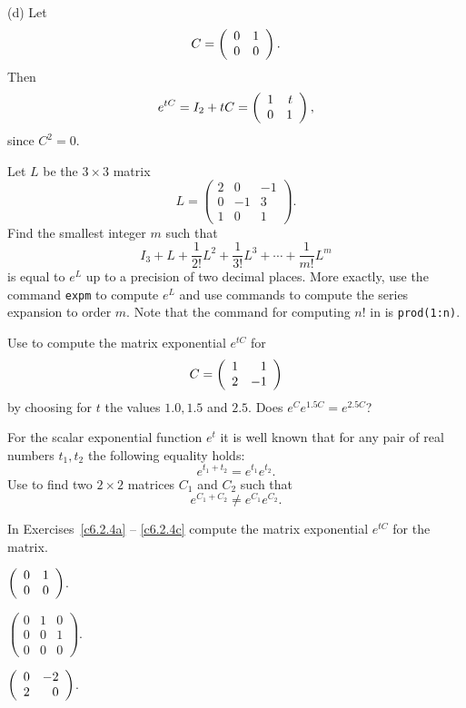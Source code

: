 \documentclass{ximera}
\begin{document}
\noindent (d) \quad Let
\[
C = \left(\begin{array}{rr} 0 & 1\\ 0 &0\end{array}\right).
\]
Then
\begin{equation}  \label{e:nilpotent}
e^{tC} = I_2 + tC = \left(\begin{array}{rr} 1 & t\\ 0 &1\end{array}\right),
\end{equation}
since $C^2=0$.

\EXER

\CEXER

\begin{exercise} \label{c6.2.1}
Let $L$ be the $3\times 3$ matrix
\[
     L = \left(\begin{array}{rrr}
    2 & 0 & -1\\
    0 & -1 & 3\\
    1 & 0 & 1
               \end{array}\right).
\]
Find the smallest integer $m$ such that
\[
  I_3+L+\frac{1}{2!} L^2 + \frac{1}{3!} L^3 + \cdots
  + \frac{1}{m!} L^m
\]
is equal to $e^L$ up to a precision of two decimal places.  More
exactly, use the \Matlab command {\tt expm} to compute $e^L$ and
use \Matlab commands to compute the series expansion to order $m$.  Note
that the command for computing $n!$ in \Matlab is
{\tt prod(1:n)}.
\end{exercise}

\begin{exercise} \label{c6.2.2}
Use \Matlab to compute the matrix exponential $e^{tC}$ for
\[
     C =\left(\begin{array}{rr} 1 & 1\\ 2 &-1\end{array}\right)
\]
by choosing for $t$ the values $1.0,1.5$ and $2.5$.  Does $e^{C}
e^{1.5C}=e^{2.5C}$?
\end{exercise}

\begin{exercise} \label{c6.2.3}
For the scalar exponential function $e^{t}$ it is well known
that for any pair of real numbers $t_1,t_2$ the following
equality holds:
\[
     e^{t_1+t_2} = e^{t_1}e^{t_2}.
\]
Use \Matlab to find two $2\times 2$ matrices $C_1$ and $C_2$ such that
\[
     e^{C_1+C_2} \not= e^{C_1}e^{C_2}.
\]
\end{exercise}

\TEXER

\noindent In Exercises~\ref{c6.2.4a} -- \ref{c6.2.4c} compute the matrix
exponential $e^{tC}$ for the matrix.
\begin{exercise} \label{c6.2.4a}
                $\left(\begin{array}{rr} 0 & 1\\ 0 &0\end{array}\right)$.
\end{exercise}
\begin{exercise} \label{c6.2.4b}
                $\left(\begin{array}{ccc}
                0 & 1 & 0\\
                0 & 0 & 1\\
                0 & 0 & 0 \end{array}\right)$.
\end{exercise}
\begin{exercise} \label{c6.2.4c}
                $\left(\begin{array}{rr} 0 & -2\\ 2 &0\end{array}\right)$.
\end{exercise}
\end{document}
